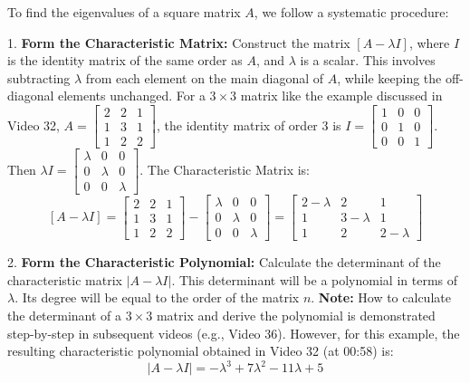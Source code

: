 \documentclass{article}
\begin{document}
To find the eigenvalues of a square matrix $A$, we follow a systematic procedure:

1.  \textbf{Form the Characteristic Matrix:} Construct the matrix $[A - \lambda I]$, where $I$ is the identity matrix of the same order as $A$, and $\lambda$ is a scalar. This involves subtracting $\lambda$ from each element on the main diagonal of $A$, while keeping the off-diagonal elements unchanged.
    For a $3 \times 3$ matrix like the example discussed in Video 32, $A = \begin{bmatrix} 2 & 2 & 1 \\ 1 & 3 & 1 \\ 1 & 2 & 2 \end{bmatrix}$, the identity matrix of order 3 is $I = \begin{bmatrix} 1 & 0 & 0 \\ 0 & 1 & 0 \\ 0 & 0 & 1 \end{bmatrix}$.
    Then $\lambda I = \begin{bmatrix} \lambda & 0 & 0 \\ 0 & \lambda & 0 \\ 0 & 0 & \lambda \end{bmatrix}$.
    The Characteristic Matrix is:
    \[ [A - \lambda I] = \begin{bmatrix} 2 & 2 & 1 \\ 1 & 3 & 1 \\ 1 & 2 & 2 \end{bmatrix} - \begin{bmatrix} \lambda & 0 & 0 \\ 0 & \lambda & 0 \\ 0 & 0 & \lambda \end{bmatrix} = \begin{bmatrix} 2 - \lambda & 2 & 1 \\ 1 & 3 - \lambda & 1 \\ 1 & 2 & 2 - \lambda \end{bmatrix} \]

2.  \textbf{Form the Characteristic Polynomial:} Calculate the determinant of the characteristic matrix $|A - \lambda I|$. This determinant will be a polynomial in terms of $\lambda$. Its degree will be equal to the order of the matrix $n$.
    \textbf{Note:} How to calculate the determinant of a $3 \times 3$ matrix and derive the polynomial is demonstrated step-by-step in subsequent videos (e.g., Video 36). However, for this example, the resulting characteristic polynomial obtained in Video 32 (at 00:58) is:
    \[ |A - \lambda I| = -\lambda^3 + 7\lambda^2 - 11\lambda + 5 \]
\end{document}
